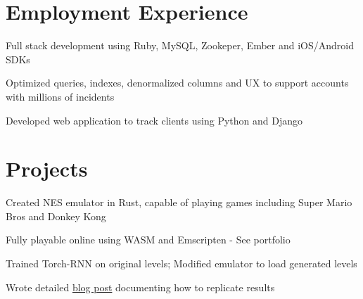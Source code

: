 \documentclass[]{deedy-resume-openfont}
\begin{document}
\begin{minipage}[t]{0.67\textwidth}

\section{Employment Experience}
\vspace{\topsep} %
\begin{tightemize}
	\item Full stack development using Ruby, MySQL, Zookeper, Ember and iOS/Android SDKs
	\item Optimized queries, indexes, denormalized columns and UX to support accounts with millions of incidents
\end{tightemize}
\sectionsep

\begin{tightemize}
	\item Developed web application to track clients using Python and Django
\end{tightemize}
\sectionsep

\section{Projects}

\begin{tightemize}
	\item Created NES emulator in Rust, capable of playing games including Super Mario Bros and Donkey Kong
	\item Fully playable online using WASM and Emscripten - See portfolio
\end{tightemize}
\sectionsep

\begin{tightemize}
	\item Trained Torch-RNN on original levels; Modified emulator to load generated levels
	\item Wrote detailed  \href{https://medium.com/@justin_michaud/super-mario-bros-level-generation-using-torch-rnn-726ddea7e9b7}{blog post} documenting how to replicate results
\end{tightemize}
\sectionsep


\end{minipage}
\end{document}
